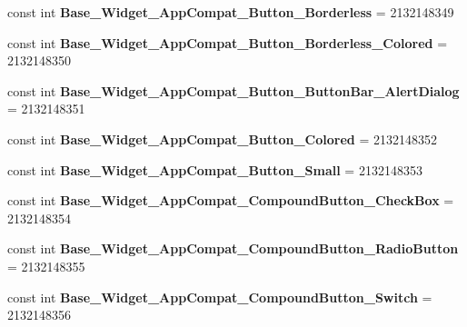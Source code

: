 \begin{DoxyCompactItemize}
\mbox{\label{classst_delivery_1_1_resource_1_1_style_a425b8078f29543bd4cc12b4a186a4dcb}} 
const int {\bfseries Base\+\_\+\+Widget\+\_\+\+App\+Compat\+\_\+\+Button\+\_\+\+Borderless} = 2132148349
\item 
\mbox{\label{classst_delivery_1_1_resource_1_1_style_ade24d216ff303c93355594a537bbc1bc}} 
const int {\bfseries Base\+\_\+\+Widget\+\_\+\+App\+Compat\+\_\+\+Button\+\_\+\+Borderless\+\_\+\+Colored} = 2132148350
\item 
\mbox{\label{classst_delivery_1_1_resource_1_1_style_addedcdabee3ef4f7b93c8cd2b48b2b1b}} 
const int {\bfseries Base\+\_\+\+Widget\+\_\+\+App\+Compat\+\_\+\+Button\+\_\+\+Button\+Bar\+\_\+\+Alert\+Dialog} = 2132148351
\item 
\mbox{\label{classst_delivery_1_1_resource_1_1_style_ae300168e7737582bfc530875845ec379}} 
const int {\bfseries Base\+\_\+\+Widget\+\_\+\+App\+Compat\+\_\+\+Button\+\_\+\+Colored} = 2132148352
\item 
\mbox{\label{classst_delivery_1_1_resource_1_1_style_a8f4307c58c02941932bf40086995fdcd}} 
const int {\bfseries Base\+\_\+\+Widget\+\_\+\+App\+Compat\+\_\+\+Button\+\_\+\+Small} = 2132148353
\item 
\mbox{\label{classst_delivery_1_1_resource_1_1_style_ae47d262640475803b73364ec2272c3df}} 
const int {\bfseries Base\+\_\+\+Widget\+\_\+\+App\+Compat\+\_\+\+Compound\+Button\+\_\+\+Check\+Box} = 2132148354
\item 
\mbox{\label{classst_delivery_1_1_resource_1_1_style_aef6e491d25e7decdf521a7f5e1dd6867}} 
const int {\bfseries Base\+\_\+\+Widget\+\_\+\+App\+Compat\+\_\+\+Compound\+Button\+\_\+\+Radio\+Button} = 2132148355
\item 
\mbox{\label{classst_delivery_1_1_resource_1_1_style_a82771b1be07deda91040525b055ccba1}} 
const int {\bfseries Base\+\_\+\+Widget\+\_\+\+App\+Compat\+\_\+\+Compound\+Button\+\_\+\+Switch} = 2132148356

\end{DoxyCompactItemize}
